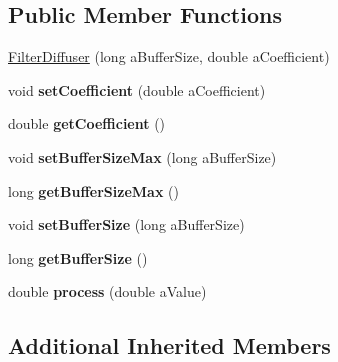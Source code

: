 \subsection*{Public Member Functions}
\begin{DoxyCompactItemize}
\item 
\hyperlink{class_filter_diffuser_a5f7ad7932fbb9342a0e47cb9394a86c6}{Filter\-Diffuser} (long a\-Buffer\-Size, double a\-Coefficient)
\item 
\hypertarget{class_filter_diffuser_ad7cb6afc1aab4676b0c59a3c52b44531}{void {\bfseries set\-Coefficient} (double a\-Coefficient)}\label{class_filter_diffuser_ad7cb6afc1aab4676b0c59a3c52b44531}

\item 
\hypertarget{class_filter_diffuser_a725c280342822037cd00900effa2dbf2}{double {\bfseries get\-Coefficient} ()}\label{class_filter_diffuser_a725c280342822037cd00900effa2dbf2}

\item 
\hypertarget{class_filter_diffuser_ad37c35fb2cfbc9c5021fa68684fb209a}{void {\bfseries set\-Buffer\-Size\-Max} (long a\-Buffer\-Size)}\label{class_filter_diffuser_ad37c35fb2cfbc9c5021fa68684fb209a}

\item 
\hypertarget{class_filter_diffuser_a8af3a7fbd945af6c2c5be4b66998f1dd}{long {\bfseries get\-Buffer\-Size\-Max} ()}\label{class_filter_diffuser_a8af3a7fbd945af6c2c5be4b66998f1dd}

\item 
\hypertarget{class_filter_diffuser_a062dc2d293746ddad2f274fac403d0fc}{void {\bfseries set\-Buffer\-Size} (long a\-Buffer\-Size)}\label{class_filter_diffuser_a062dc2d293746ddad2f274fac403d0fc}

\item 
\hypertarget{class_filter_diffuser_aeb3d5ee67babb7089a89f8e40daaf2e7}{long {\bfseries get\-Buffer\-Size} ()}\label{class_filter_diffuser_aeb3d5ee67babb7089a89f8e40daaf2e7}

\item 
\hypertarget{class_filter_diffuser_af1dec2a29fad45d60a97e859e84c5214}{double {\bfseries process} (double a\-Value)}\label{class_filter_diffuser_af1dec2a29fad45d60a97e859e84c5214}

\end{DoxyCompactItemize}
\subsection*{Additional Inherited Members}


